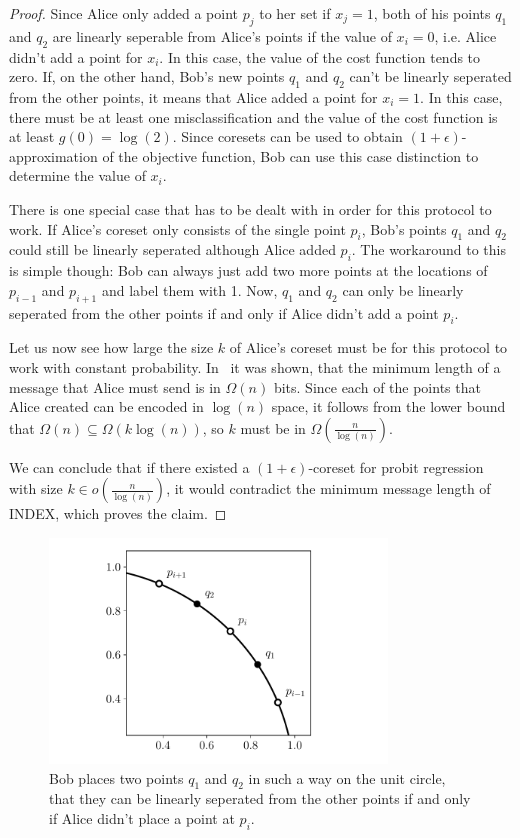 \begin{proof}
    Since Alice only added a point $p_j$ to her set if $x_j = 1$, both
    of his points $q_1$ and $q_2$ are linearly seperable from Alice's points if
    the value of $x_i = 0$, i.e. Alice didn't add a point for $x_i$.
    In this case, the value of the cost function tends to zero.
    If, on the other hand, Bob's new points $q_1$ and $q_2$ can't be linearly
    seperated from the other points, it means that Alice added a point
    for $x_i = 1$. In this case, there must be at least one
    misclassification and the value of the cost function is at least
    $g(0) = \log(2)$.
    Since coresets can be used to obtain $(1 + \epsilon)$-approximation
    of the objective function, Bob can use this case distinction to
    determine the value of $x_i$.

    There is one special case that has to be dealt with in order for this
    protocol to work. If Alice's coreset only consists of the single point
    $p_i$, Bob's points $q_1$ and $q_2$ could still be linearly seperated
    although Alice added $p_i$.
    The workaround to this is simple though:
    Bob can always just add two more
    points at the locations of $p_{i-1}$ and $p_{i+1}$ and label them with 1.
    Now, $q_1$ and $q_2$ can only be linearly seperated from the
    other points if and only if Alice didn't add a point $p_i$.

    Let us now see how large the size $k$ of Alice's coreset must be
    for this protocol to work with constant probability.
    In~\cite{index} it was shown, that the minimum length of a message
    that Alice must send is in $\Omega(n)$ bits.
    Since each of the points that Alice created can be encoded in
    $\log(n)$ space, it follows from the lower bound that
    $\Omega(n) \subseteq \Omega(k \log(n))$, so $k$ must be in
    $\Omega\left(\frac{n}{\log(n)}\right)$.

    We can conclude that if there existed a $(1 + \epsilon)$-coreset
    for probit regression with size $k \in o\left(\frac{n}{\log(n)}\right)$,
    it would contradict the minimum message length of
    INDEX, which proves the claim.
\end{proof}

\begin{figure}
    \centering
    \includegraphics[width=0.8\textwidth]{figures/index.pdf}
    \caption{Bob places two points $q_1$ and $q_2$ in such a way
        on the unit circle, that they can be linearly seperated from the other
        points if and only if Alice didn't place a point at $p_i$.}
    \label{fig:index}
\end{figure}
